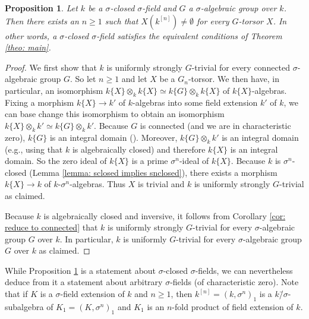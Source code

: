 \documentclass[oneside,reqno]{amsart}
\newtheorem{prop}[theo]{Proposition}
\theoremstyle{definition}
\newcommand{\s}{\sigma}
\newcommand{\ks}{$k$\=/$\s$}
\newcommand{\kn}{k^{[n]}}
\begin{document}
\begin{prop} \label{prop: sclosed implies P1}
	Let $k$ be a $\s$-closed $\s$-field and $G$ a $\s$-algebraic group over $k$. Then there exists an $n\geq 1$ such that $X(\kn)\neq\emptyset$ for every $G$-torsor $X$. In other words, a $\s$-closed $\s$-field satisfies the equivalent conditions of Theorem \ref{theo: main}.
\end{prop}	
\begin{proof}
	We first show that $k$ is uniformly strongly $G$-trivial for every connected $\s$-algebraic group $G$. So let $n\geq 1$ and let $X$ be a $G_n$-torsor. We then have, in particular, an isomorphism $k\{X\}\otimes_k k\{X\}\simeq k\{G\}\otimes_kk\{X\}$ of $k\{X\}$-algebras. Fixing a morphism $k\{X\}\to k'$ of $k$-algebras into some field extension $k'$ of $k$, we can base change this isomorphism to obtain an isomorphism $k\{X\}\otimes_k k'\simeq k\{G\}\otimes_kk'$. Because $G$ is connected (and we are in characteristic zero), $k\{G\}$ is an integral domain (\cite[Lemma 6.7]{Wibmer:almostsimple}). Moreover, $k\{G\}\otimes_kk'$ is an integral domain (e.g., using that $k$ is algebraically closed) and therefore $k\{X\}$ is an integral domain. So the zero ideal of $k\{X\}$ is a prime $\s^n$-ideal of $k\{X\}$. Because $k$ is $\s^n$-closed (Lemma \ref{lemma: sclosed implies snclosed}), there exists a morphism $k\{X\}\to k$ of $k$-$\s^n$-algebras. Thus $X$ is trivial and $k$ is uniformly strongly $G$-trivial as claimed.	
	
	Because $k$ is algebraically closed and inversive, it follows from Corollary \ref{cor: reduce to connected} that $k$ is uniformly strongly $G$-trivial for every $\s$-algebraic group $G$ over $k$. In particular, $k$ is uniformly $G$-trivial for every $\s$-algebraic group $G$ over $k$ as claimed.  	
\end{proof}	

While Proposition \ref{prop: sclosed implies P1} is a statement about $\s$-closed $\s$-fields, we can nevertheless deduce from it a statement about arbitrary $\s$-fields (of characteristic zero). Note that if $K$ is a $\s$-field extension of $k$ and $n\geq 1$, then $\kn=(k,\s^n)_1$ is a \ks-subalgebra of $K_1=(K,\s^n)_1$ and $K_1$ is an $n$-fold product of field extension of $k$.
\end{document}
